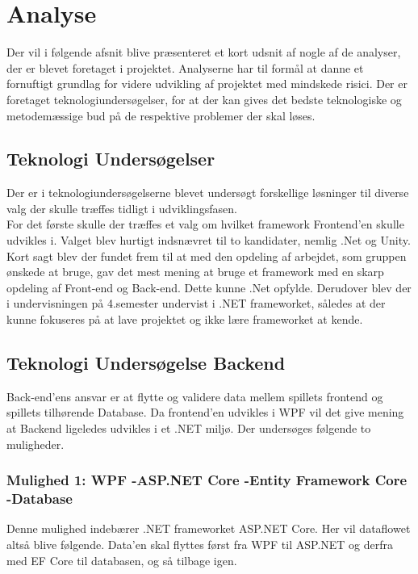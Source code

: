 \section{Analyse}
Der vil i følgende afsnit blive præsenteret et kort udsnit af nogle af de analyser, der er blevet foretaget i projektet. Analyserne har til formål at danne et fornuftigt grundlag for videre udvikling af
projektet med mindskede risici. Der er foretaget teknologiundersøgelser, for at der kan gives det bedste teknologiske og metodemæssige bud på de respektive problemer der skal løses.

\subsection{Teknologi Undersøgelser}
Der er i teknologiundersøgelserne blevet undersøgt forskellige løsninger til diverse valg der skulle træffes tidligt i udviklingsfasen.\\
For det første skulle der træffes et valg om hvilket framework Frontend'en skulle udvikles i. Valget blev hurtigt indsnævret til to kandidater, nemlig .Net og Unity. Kort sagt blev der fundet frem til at med den opdeling af arbejdet, som gruppen ønskede at bruge, gav det mest mening at bruge et framework med en skarp opdeling af Front-end og Back-end. Dette kunne .Net opfylde. Derudover blev der i undervisningen på 4.semester undervist i .NET frameworket, således at der kunne fokuseres på at lave projektet og ikke lære frameworket at kende. 


\subsection{Teknologi Undersøgelse Backend}
Back-end’ens ansvar er at flytte og validere data mellem spillets frontend og spillets tilhørende Database. Da frontend'en udvikles i WPF vil det give mening at Backend ligeledes udvikles i et .NET miljø. Der undersøges følgende to muligheder.\\

\subsubsection{Mulighed 1: WPF -\g ASP.NET Core -\g Entity Framework Core -\g Database}
Denne mulighed indebærer .NET frameworket ASP.NET Core. Her vil dataflowet altså blive følgende. Data’en skal flyttes først fra WPF til ASP.NET og derfra med EF Core\cite{Entity-Framework-Core} til databasen, og så tilbage igen.

